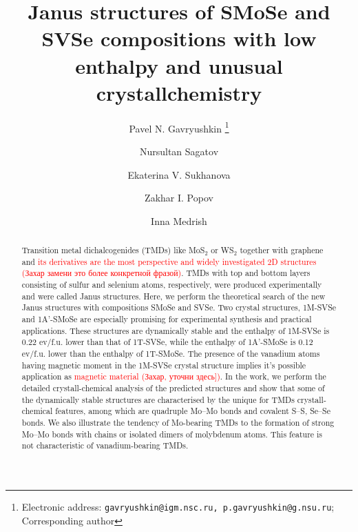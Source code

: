 \documentclass[a4paperm]{article}
\begin{document}

\title{Janus structures of SMoSe and SVSe compositions with low enthalpy and unusual crystallchemistry}


\author[1,2,3]{Pavel N. Gavryushkin
   \thanks{Electronic address: \texttt{gavryushkin@igm.nsc.ru, p.gavryushkin@g.nsu.ru}; Corresponding author}}     
\author[2]{Nursultan Sagatov}
\author[1]{Ekaterina V. Sukhanova}
\author[1]{Zakhar I. Popov}
\author[4]{Inna Medrish}



\date{}
\maketitle


\begin{abstract}
Transition metal dichalcogenides (TMDs) like MoS$_2$ or WS$_2$ together with graphene and \textcolor{red}{its derivatives are the most perspective and widely investigated 2D structures (Захар замени это более конкретной фразой)}.
TMDs with top and bottom layers consisting of sulfur and selenium atoms, respectively, were produced experimentally and were called Janus structures.
Here, we perform the theoretical search of the new Janus structures with compositions SMoSe and SVSe.
Two crystal structures, 1M-SVSe and 1A'-SMoSe are especially promising for experimental synthesis and practical applications.
These structures are dynamically stable and the enthalpy of 1M-SVSe is 0.22 ev/f.u. lower than that of 1T-SVSe, while the enthalpy of 1A'-SMoSe is 0.12 ev/f.u. lower than the enthalpy of 1T-SMoSe.
The presence of the vanadium atoms having magnetic moment in the 1M-SVSe crystal structure implies it's possible application as \textcolor{red}{magnetic material (Захар, уточни здесь])}.
In the work, we perform the detailed crystall-chemical analysis of the predicted structures and show that some of the dynamically stable structures are characterised by the unique for TMDs crystall-chemical features, among which are quadruple Mo--Mo bonds and covalent S--S, Se--Se bonds.
We also illustrate the tendency of Mo-bearing TMDs to the formation of strong Mo--Mo bonds with chains or isolated  dimers of molybdenum atoms.
This feature is not characteristic of vanadium-bearing TMDs.

\end{abstract}
\end{document}
